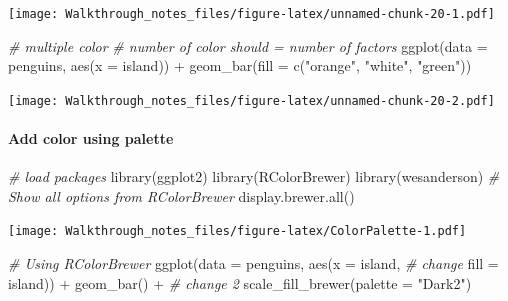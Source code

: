 \documentclass[
]{article}
\newenvironment{Shaded}{\begin{snugshade}}{\end{snugshade}}
\newcommand{\AttributeTok}[1]{\textcolor[rgb]{0.77,0.63,0.00}{#1}}
\newcommand{\CommentTok}[1]{\textcolor[rgb]{0.56,0.35,0.01}{\textit{#1}}}
\newcommand{\FunctionTok}[1]{\textcolor[rgb]{0.00,0.00,0.00}{#1}}
\newcommand{\NormalTok}[1]{#1}
\newcommand{\SpecialCharTok}[1]{\textcolor[rgb]{0.00,0.00,0.00}{#1}}
\newcommand{\StringTok}[1]{\textcolor[rgb]{0.31,0.60,0.02}{#1}}
\begin{document}
\texttt{[image: Walkthrough\_notes\_files/figure-latex/unnamed-chunk-20-1.pdf]}

\begin{Shaded}
\begin{Highlighting}[]
\CommentTok{\# multiple color}
\CommentTok{\# number of color should = number of factors}
\FunctionTok{ggplot}\NormalTok{(}\AttributeTok{data =}\NormalTok{ penguins, }\FunctionTok{aes}\NormalTok{(}\AttributeTok{x =}\NormalTok{ island)) }\SpecialCharTok{+} 
  \FunctionTok{geom\_bar}\NormalTok{(}\AttributeTok{fill =} \FunctionTok{c}\NormalTok{(}\StringTok{"orange"}\NormalTok{, }\StringTok{"white"}\NormalTok{, }\StringTok{"green"}\NormalTok{))}
\end{Highlighting}
\end{Shaded}

\texttt{[image: Walkthrough\_notes\_files/figure-latex/unnamed-chunk-20-2.pdf]}

\hypertarget{add-color-using-palette}{%
\paragraph{Add color using palette}\label{add-color-using-palette}}

\begin{Shaded}
\begin{Highlighting}[]
\CommentTok{\# load packages}
\FunctionTok{library}\NormalTok{(ggplot2)}
\FunctionTok{library}\NormalTok{(RColorBrewer)}
\FunctionTok{library}\NormalTok{(wesanderson)}
\CommentTok{\# Show all options from RColorBrewer}
\FunctionTok{display.brewer.all}\NormalTok{()}
\end{Highlighting}
\end{Shaded}

\texttt{[image: Walkthrough\_notes\_files/figure-latex/ColorPalette-1.pdf]}

\begin{Shaded}
\begin{Highlighting}[]
\CommentTok{\# Using RColorBrewer}
\FunctionTok{ggplot}\NormalTok{(}\AttributeTok{data =}\NormalTok{ penguins, }\FunctionTok{aes}\NormalTok{(}\AttributeTok{x =}\NormalTok{ island, }
\CommentTok{\# change                            }
                            \AttributeTok{fill =}\NormalTok{ island)) }\SpecialCharTok{+} 
  \FunctionTok{geom\_bar}\NormalTok{() }\SpecialCharTok{+} 
\CommentTok{\# change 2  }
    \FunctionTok{scale\_fill\_brewer}\NormalTok{(}\AttributeTok{palette =} \StringTok{"Dark2"}\NormalTok{)}
\end{Highlighting}
\end{Shaded}
\end{document}
